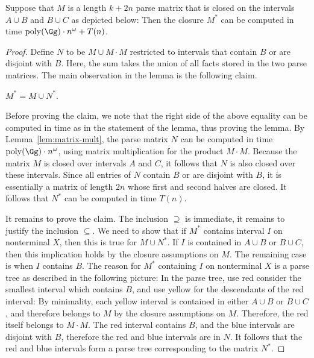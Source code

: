 \begin{lemma}\label{lem:overlap}
Suppose that $M$ is a length $k+2n$ parse matrix that is closed on the intervals $A \cup B$ and $B \cup C$ as depicted below: 
Then the closure $M^*$  can be computed in time 
 $ \mathrm{poly}(\Gg)  \cdot n^\omega + T(n)$.
\end{lemma}
\begin{proof}  
Define $N$ to be $M \cup M \cdot M$ restricted to intervals that contain $B$ or are disjoint with $B$. Here, the sum takes the union of all facts stored in the two parse matrices.    The main observation in the lemma is
the following claim.
\begin{claim}
	$M^* = M \cup N^*$.
\end{claim}

Before proving the claim, we note that the right side of the above equality can be computed in time as in the statement of the lemma, thus proving the lemma.   By Lemma~\ref{lem:matrix-mult}, the parse matrix $N$ can be computed in time $\mathrm{poly}(\Gg)  \cdot n^\omega$, using matrix multiplication for the product $M \cdot M$. Because the matrix $M$ is closed over intervals $A$ and $C$, it follows that $N$ is also closed over these intervals. Since all entries of $N$ contain $B$ or are disjoint with $B$, it is essentially a matrix of length $2n$ whose first and second halves are closed. It follows that $N^*$ can be computed in time $T(n)$. 


It remains to prove the claim. The inclusion $\supseteq$ is immediate, it remains to justify the inclusion $\subseteq$.  
We need to show that if $M^*$ contains interval $I$ on nonterminal $X$, then this is true for $M \cup N^*$. If $I$ is contained in $A \cup B$ or $B \cup C$, then this implication holds by  the closure assumptions on $M$. The remaining case is when $I$ contains $B$. The reason for $M^*$ containing $I$ on nonterminal $X$  is  a parse tree as described in the following picture:
In the parse tree, use red consider the smallest interval which contains $B$, and use yellow for the descendants of the red interval:
By minimality, each yellow interval is contained in either  $A \cup B$ or  $B \cup C$, and therefore belongs to  $M$ by the closure assumptions on $M$.  Therefore, the red itself belongs to $M \cdot M$. The red interval contains $B$, and the blue intervals are disjoint with $B$, therefore the red and blue intervals are in $N$. It follows that the red and blue intervals form a parse tree corresponding  to the matrix  $N^*$. 
\end{proof}


